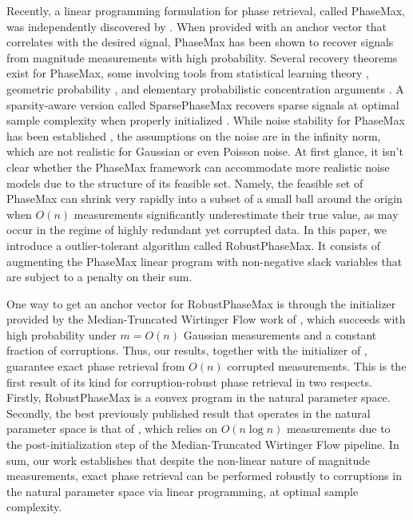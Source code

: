 \documentclass[12pt]{article}
\newcommand{\1}{\mathbbm{1}}
\begin{document}
Recently, a linear programming formulation for phase retrieval, called PhaseMax, was independently discovered by \cite{phasemax, phasemaxJustin}. When provided with an anchor vector that correlates with the desired signal,  PhaseMax has been shown to recover signals from magnitude measurements with high probability.  Several recovery theorems exist for PhaseMax, some involving tools from statistical learning theory \cite{phasemaxJustin}, geometric probability \cite{phasemax}, and elementary probabilistic concentration arguments \cite{phasemaxelementary}.  A sparsity-aware version called SparsePhaseMax recovers sparse signals at optimal sample complexity when properly initialized \cite{sparsephasemax}.  
While noise stability for PhaseMax has been established \cite{phasemax, phasemaxJustin}, the assumptions on the noise are in the infinity norm, which are not realistic for Gaussian or even Poisson noise. At first glance, it isn't clear whether the PhaseMax framework can accommodate more realistic noise models due to the structure of its feasible set. Namely, the feasible set of PhaseMax can shrink very rapidly into a subset of a small ball around the origin when $O(n)$ measurements  significantly underestimate their true value, as may occur in the regime of highly redundant yet corrupted data. In this paper, we introduce a outlier-tolerant algorithm called RobustPhaseMax.  It consists of augmenting the PhaseMax linear program with non-negative slack variables that are subject to a penalty on their sum.  %

One way to get an anchor vector for RobustPhaseMax is through the 
initializer provided by the Median-Truncated Wirtinger Flow work of \cite{medianwirtingerflow}, which succeeds with high probability under $m = O(n)$ Gaussian measurements and a constant fraction of corruptions.   Thus, our results, together with the initializer of \cite{medianwirtingerflow}, guarantee exact phase retrieval from $O(n)$ corrupted measurements. This is the first result of its kind for corruption-robust phase retrieval in two respects. Firstly, RobustPhaseMax is a convex program in the natural parameter space. Secondly, the best previously published result that operates in the natural parameter space is that of \cite{medianwirtingerflow}, which relies on $O(n \log n)$ measurements due to the post-initialization step of the Median-Truncated Wirtinger Flow pipeline. In sum, our work establishes that despite the non-linear nature of magnitude measurements, exact phase retrieval can be performed robustly to corruptions in the natural parameter space via linear programming, at optimal sample complexity.  
\end{document}
